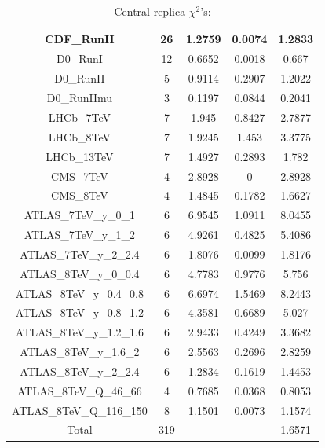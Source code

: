 \documentclass[
]{article}
\begin{document}
\begin{table}[h]
\begin{tabular}{|c|c|c|c|c|}
CDF\_RunII & 26 & 1.2759 & 0.0074 & 1.2833 \\ \hline
D0\_RunI & 12 & 0.6652 & 0.0018 & 0.667 \\ \hline
D0\_RunII & 5 & 0.9114 & 0.2907 & 1.2022 \\ \hline
D0\_RunIImu & 3 & 0.1197 & 0.0844 & 0.2041 \\ \hline
LHCb\_7TeV & 7 & 1.945 & 0.8427 & 2.7877 \\ \hline
LHCb\_8TeV & 7 & 1.9245 & 1.453 & 3.3775 \\ \hline
LHCb\_13TeV & 7 & 1.4927 & 0.2893 & 1.782 \\ \hline
CMS\_7TeV & 4 & 2.8928 & 0 & 2.8928 \\ \hline
CMS\_8TeV & 4 & 1.4845 & 0.1782 & 1.6627 \\ \hline
ATLAS\_7TeV\_y\_0\_1 & 6 & 6.9545 & 1.0911 & 8.0455 \\ \hline
ATLAS\_7TeV\_y\_1\_2 & 6 & 4.9261 & 0.4825 & 5.4086 \\ \hline
ATLAS\_7TeV\_y\_2\_2.4 & 6 & 1.8076 & 0.0099 & 1.8176 \\ \hline
ATLAS\_8TeV\_y\_0\_0.4 & 6 & 4.7783 & 0.9776 & 5.756 \\ \hline
ATLAS\_8TeV\_y\_0.4\_0.8 & 6 & 6.6974 & 1.5469 & 8.2443 \\ \hline
ATLAS\_8TeV\_y\_0.8\_1.2 & 6 & 4.3581 & 0.6689 & 5.027 \\ \hline
ATLAS\_8TeV\_y\_1.2\_1.6 & 6 & 2.9433 & 0.4249 & 3.3682 \\ \hline
ATLAS\_8TeV\_y\_1.6\_2 & 6 & 2.5563 & 0.2696 & 2.8259 \\ \hline
ATLAS\_8TeV\_y\_2\_2.4 & 6 & 1.2834 & 0.1619 & 1.4453 \\ \hline
ATLAS\_8TeV\_Q\_46\_66 & 4 & 0.7685 & 0.0368 & 0.8053 \\ \hline
ATLAS\_8TeV\_Q\_116\_150 & 8 & 1.1501 & 0.0073 & 1.1574 \\ \hline
Total & 319 & - & - & 1.6571 \\ \hline

\end{tabular}

\caption{Central-replica \(\chi^2\)'s:}

\end{table}
\end{document}
